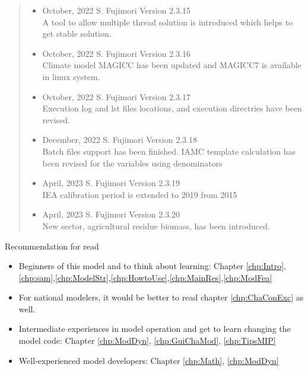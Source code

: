 \documentclass[10pt,a4paper,titlepage,dvipdfmx]{book}
\begin{document}
\begin{quote}
\begin{itemize}
  \item October, 2022 S. Fujimori Version 2.3.15 \\
      A tool to allow multiple thread solution is introduced which helps to get stable solution.

  \item October, 2022 S. Fujimori Version 2.3.16 \\
      Climate model MAGICC has been updated and MAGICC7 is available in linux system.

  \item October, 2022 S. Fujimori Version 2.3.17 \\
      Execution log and lst files locations, and execution directries have been revised.
      
  \item December, 2022 S. Fujimori Version 2.3.18 \\
      Batch files support has been finished.
      IAMC template calculation has been revised for the variables using denominators 

  \item April, 2023 S. Fujimori Version 2.3.19 \\
      IEA calibration period is extended to 2019 from 2015 
      
  \item April, 2023 S. Fujimori Version 2.3.20 \\
      New sector, agricultural residue biomass, has been introduced. 
      
  \end{itemize}
\end{quote}
\newpage

{\large Recommendation for read}

\begin{itemize}
  \item Beginners of this model and to think about learning: Chapter \ref{chp:Intro},\ref{chp:sam},\ref{chp:ModelStr},\ref{chp:HowtoUse},\ref{chp:MainRes},\ref{chp:ModFea}
  \item For national modelers, it would be better to read chapter \ref{chp:ChaConExc} as well.
  \item Intermediate experiences in model operation and get to learn changing the model code: Chapter \ref{chp:ModDyn}, \ref{chp:GuiChaMod}, \ref{chp:TipsMIP}
  \item Well-experienced model developers: Chapter \ref{chp:Math}, \ref{chp:ModDyn}
\end{itemize}
\end{document}
